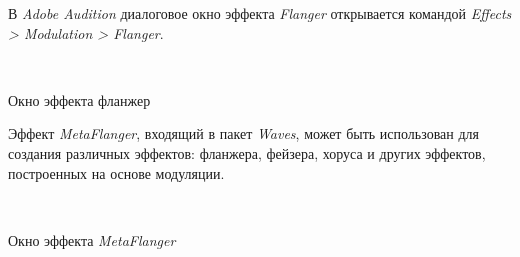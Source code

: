 \documentclass{beamer}
\begin{document}
\begin{frame}
  В \emph{Adobe Audition} диалоговое окно эффекта \textit{Flanger} открывается командой \textit{Effects > Modulation > Flanger}.

  ~

  \begin{block}{Окно эффекта фланжер}
  \end{block}
\end{frame}

\begin{frame}
  Эффект \emph{MetaFlanger}, входящий в пакет \emph{Waves}, может быть использован для создания различных эффектов: фланжера, фейзера, хоруса и других эффектов, построенных на основе модуляции.

  ~

  \begin{block}{Окно эффекта \emph{MetaFlanger}}
  \end{block}
\end{frame}
\end{document}
